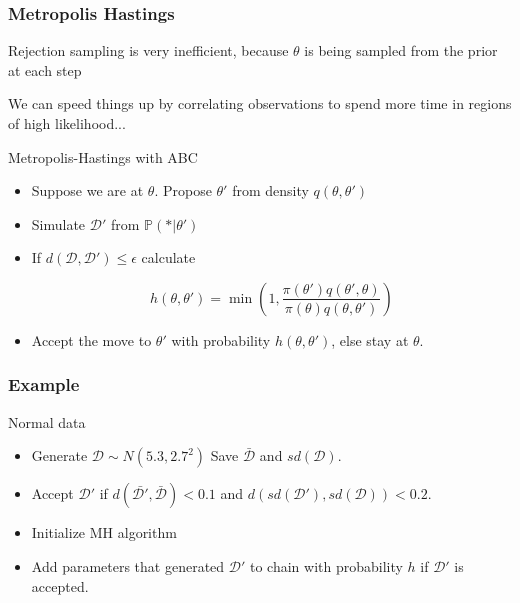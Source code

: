 \documentclass{beamer}
\begin{document}
\begin{frame}
  \frametitle{Metropolis Hastings}

Rejection sampling is very inefficient, because $\theta $ is being sampled from the prior at each step

\pause

We can speed things up by correlating observations to spend more time in regions of high likelihood...

\begin{block}{Metropolis-Hastings with ABC}

  \begin{itemize}
  \item Suppose we are at $\theta$. Propose $\theta'$ from density $q ( \theta, \theta')$
  \item Simulate $\mathcal{D}'$ from $\mathbb{P} ( * | \theta')$
  \item  If $ d ( \mathcal{D}, \mathcal{D}') \leq \epsilon $ calculate 

    $$ h ( \theta , \theta ' ) = \min \left( 1 , \frac{ \pi(\theta') q ( \theta' , \theta)}{ \pi(\theta) q ( \theta, \theta')} \right)$$
  \item  Accept the move to $\theta'$ with probability $h( \theta, \theta')$, else stay at $\theta$.
  \end{itemize}
  
\end{block}

\end{frame}


\begin{frame}
  \frametitle{Example}

  \begin{block}{Normal data}
    \begin{itemize}
    \item Generate $\mathcal{D} \sim N(5.3 , 2.7^2)$ Save $\bar{\mathcal{D}}$ and $sd(\mathcal{D})$.
    \item Accept $\mathcal{D}'$ if $ d ( \bar{\mathcal{D}'} , \bar{\mathcal{D}}) < 0.1 $ and $ d (sd(\mathcal{D}') , sd ( \mathcal{D} )) < 0.2$. 
    \item Initialize MH algorithm
      
    \item  Add parameters that generated $\mathcal{D}'$ to chain with probability $h$ if $\mathcal{D}'$ is accepted.
    \end{itemize}
  \end{block}

\end{frame}
\end{document}
